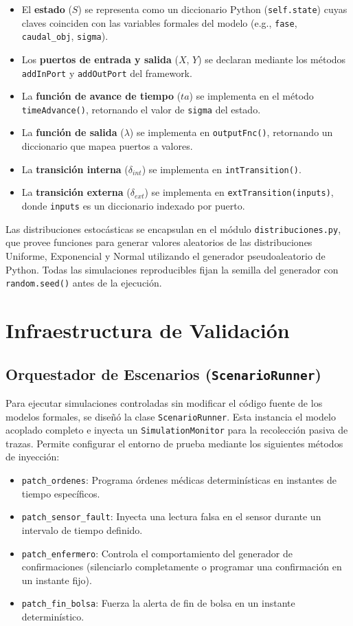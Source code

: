 \begin{itemize}
    \item El \textbf{estado} ($S$) se representa como un diccionario Python (\texttt{self.state}) cuyas claves coinciden con las variables formales del modelo (e.g., \texttt{fase}, \texttt{caudal\_obj}, \texttt{sigma}).
    \item Los \textbf{puertos de entrada y salida} ($X$, $Y$) se declaran mediante los métodos \texttt{addInPort} y \texttt{addOutPort} del framework.
    \item La \textbf{función de avance de tiempo} ($ta$) se implementa en el método \texttt{timeAdvance()}, retornando el valor de \texttt{sigma} del estado.
    \item La \textbf{función de salida} ($\lambda$) se implementa en \texttt{outputFnc()}, retornando un diccionario que mapea puertos a valores.
    \item La \textbf{transición interna} ($\delta_{int}$) se implementa en \texttt{intTransition()}.
    \item La \textbf{transición externa} ($\delta_{ext}$) se implementa en \texttt{extTransition(inputs)}, donde \texttt{inputs} es un diccionario indexado por puerto.
\end{itemize}

Las distribuciones estocásticas se encapsulan en el módulo \texttt{distribuciones.py}, que provee funciones para generar valores aleatorios de las distribuciones Uniforme, Exponencial y Normal utilizando el generador pseudoaleatorio de Python. Todas las simulaciones reproducibles fijan la semilla del generador con \texttt{random.seed()} antes de la ejecución.

\section{Infraestructura de Validación}

\subsection{Orquestador de Escenarios (\texttt{ScenarioRunner})}
Para ejecutar simulaciones controladas sin modificar el código fuente de los modelos formales, se diseñó la clase \texttt{ScenarioRunner}. Esta instancia el modelo acoplado completo e inyecta un \texttt{SimulationMonitor} para la recolección pasiva de trazas. Permite configurar el entorno de prueba mediante los siguientes métodos de inyección:
\begin{itemize}
    \item \texttt{patch\_ordenes}: Programa órdenes médicas determinísticas en instantes de tiempo específicos.
    \item \texttt{patch\_sensor\_fault}: Inyecta una lectura falsa en el sensor durante un intervalo de tiempo definido.
    \item \texttt{patch\_enfermero}: Controla el comportamiento del generador de confirmaciones (silenciarlo completamente o programar una confirmación en un instante fijo).
    \item \texttt{patch\_fin\_bolsa}: Fuerza la alerta de fin de bolsa en un instante determinístico.
\end{itemize}

